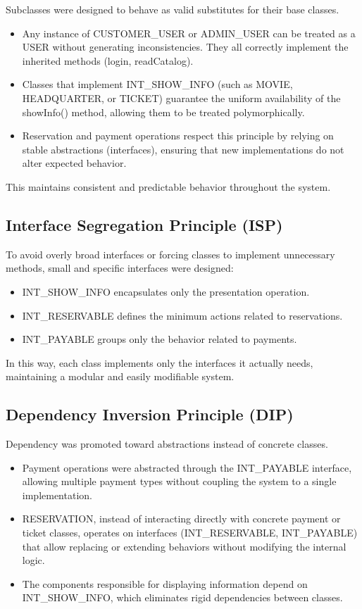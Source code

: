 \documentclass[12pt, letterpaper]{article}
\begin{document}
Subclasses were designed to behave as valid substitutes for their base classes.

\begin{itemize}
    \item Any instance of CUSTOMER\_USER or ADMIN\_USER can be treated as a USER without generating inconsistencies. They all correctly implement the inherited methods (login, readCatalog).
    \item Classes that implement INT\_SHOW\_INFO (such as MOVIE, HEADQUARTER, or TICKET) guarantee the uniform availability of the showInfo() method, allowing them to be treated polymorphically.
    \item Reservation and payment operations respect this principle by relying on stable abstractions (interfaces), ensuring that new implementations do not alter expected behavior.
\end{itemize}

This maintains consistent and predictable behavior throughout the system.

\subsection{Interface Segregation Principle (ISP)}

To avoid overly broad interfaces or forcing classes to implement unnecessary methods, small and specific interfaces were designed:

\begin{itemize}
    \item INT\_SHOW\_INFO encapsulates only the presentation operation.
    \item INT\_RESERVABLE defines the minimum actions related to reservations.
    \item INT\_PAYABLE groups only the behavior related to payments.
\end{itemize}

In this way, each class implements only the interfaces it actually needs, maintaining a modular and easily modifiable system.

\subsection{Dependency Inversion Principle (DIP)}

Dependency was promoted toward abstractions instead of concrete classes.

\begin{itemize}
    \item Payment operations were abstracted through the INT\_PAYABLE interface, allowing multiple payment types without coupling the system to a single implementation.
    \item RESERVATION, instead of interacting directly with concrete payment or ticket classes, operates on interfaces (INT\_RESERVABLE, INT\_PAYABLE) that allow replacing or extending behaviors without modifying the internal logic.
    \item The components responsible for displaying information depend on INT\_SHOW\_INFO, which eliminates rigid dependencies between classes.
\end{itemize}
\end{document}
